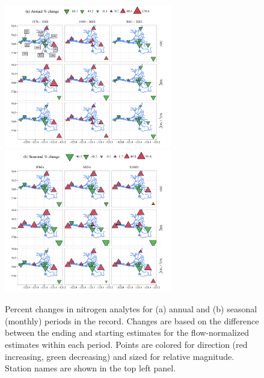 \documentclass[letterpaper,12pt,oneside]{article}\usepackage[]{graphicx}\usepackage[]{color}
\begin{document}
\begin{figure}[!ht]

{\centering \includegraphics[width=0.65\textwidth]{figs/trndmap-1} 
\includegraphics[width=0.65\textwidth]{figs/trndmap-2} 

}

\caption[Percent changes in nitrogen analytes for (a) annual and (b) seasonal (monthly) periods in the record]{Percent changes in nitrogen analytes for (a) annual and (b) seasonal (monthly) periods in the record.  Changes are based on the difference between the ending and starting estimates for the flow-normalized estimates within each period.  Points are colored for direction (red increasing, green decreasing) and sized for relative magnitude. Station names are shown in the top left panel.}\label{fig:trndmap}
\end{figure}
\end{document}
